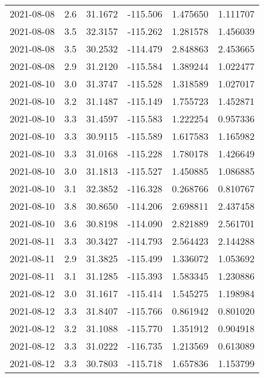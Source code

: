 \begin{tabular}{lrrrrr}
2021-08-08 &       2.6 &  31.1672 &  -115.506 &         1.475650 &         1.111707 \\
2021-08-08 &       3.5 &  32.3157 &  -115.262 &         1.281578 &         1.456039 \\
2021-08-08 &       3.5 &  30.2532 &  -114.479 &         2.848863 &         2.453665 \\
2021-08-08 &       2.9 &  31.2120 &  -115.584 &         1.389244 &         1.022477 \\
2021-08-10 &       3.0 &  31.3747 &  -115.528 &         1.318589 &         1.027017 \\
2021-08-10 &       3.2 &  31.1487 &  -115.149 &         1.755723 &         1.452871 \\
2021-08-10 &       3.3 &  31.4597 &  -115.583 &         1.222254 &         0.957336 \\
2021-08-10 &       3.3 &  30.9115 &  -115.589 &         1.617583 &         1.165982 \\
2021-08-10 &       3.3 &  31.0168 &  -115.228 &         1.780178 &         1.426649 \\
2021-08-10 &       3.0 &  31.1813 &  -115.527 &         1.450885 &         1.086885 \\
2021-08-10 &       3.1 &  32.3852 &  -116.328 &         0.268766 &         0.810767 \\
2021-08-10 &       3.8 &  30.8650 &  -114.206 &         2.698811 &         2.437458 \\
2021-08-10 &       3.6 &  30.8198 &  -114.090 &         2.821889 &         2.561701 \\
2021-08-11 &       3.3 &  30.3427 &  -114.793 &         2.564423 &         2.144288 \\
2021-08-11 &       2.9 &  31.3825 &  -115.499 &         1.336072 &         1.053692 \\
2021-08-11 &       3.1 &  31.1285 &  -115.393 &         1.583345 &         1.230886 \\
2021-08-12 &       3.0 &  31.1617 &  -115.414 &         1.545275 &         1.198984 \\
2021-08-12 &       3.3 &  31.8407 &  -115.766 &         0.861942 &         0.801020 \\
2021-08-12 &       3.2 &  31.1088 &  -115.770 &         1.351912 &         0.904918 \\
2021-08-12 &       3.3 &  31.0222 &  -116.735 &         1.213569 &         0.613089 \\
2021-08-12 &       3.3 &  30.7803 &  -115.718 &         1.657836 &         1.153799 \\

\end{tabular}
